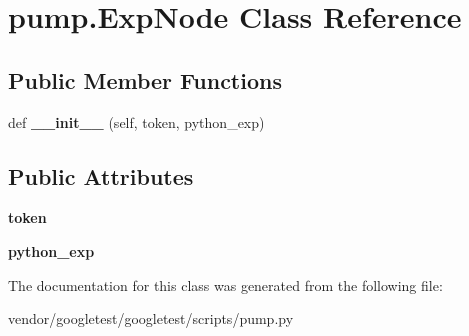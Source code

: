 \hypertarget{classpump_1_1_exp_node}{}\section{pump.\+Exp\+Node Class Reference}
\label{classpump_1_1_exp_node}
\subsection*{Public Member Functions}
\begin{DoxyCompactItemize}
\item 
\mbox{\label{classpump_1_1_exp_node_a0808c394c4d3c8ac875005caa1b3e1b3}} 
def {\bfseries \+\_\+\+\_\+init\+\_\+\+\_\+} (self, token, python\+\_\+exp)
\end{DoxyCompactItemize}
\subsection*{Public Attributes}
\begin{DoxyCompactItemize}
\item 
\mbox{\label{classpump_1_1_exp_node_ade05a5a32535d717dc5c194569aaf356}} 
{\bfseries token}
\item 
\mbox{\label{classpump_1_1_exp_node_adccfe4778c2e34f6b2c88118c0f1587f}} 
{\bfseries python\+\_\+exp}
\end{DoxyCompactItemize}


The documentation for this class was generated from the following file\+:\begin{DoxyCompactItemize}
\item 
vendor/googletest/googletest/scripts/pump.\+py\end{DoxyCompactItemize}
